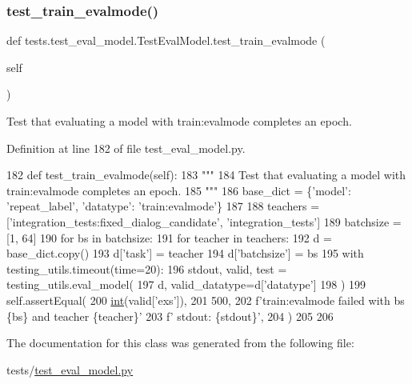 \subsubsection{\texorpdfstring{test\+\_\+train\+\_\+evalmode()}{test\_train\_evalmode()}}
{\footnotesize\ttfamily def tests.\+test\+\_\+eval\+\_\+model.\+Test\+Eval\+Model.\+test\+\_\+train\+\_\+evalmode (\begin{DoxyParamCaption}\item[{}]{self }\end{DoxyParamCaption})}

\begin{DoxyVerb}Test that evaluating a model with train:evalmode completes an epoch.
\end{DoxyVerb}
 

Definition at line 182 of file test\+\_\+eval\+\_\+model.\+py.


\begin{DoxyCode}
182     \textcolor{keyword}{def }test\_train\_evalmode(self):
183         \textcolor{stringliteral}{"""}
184 \textcolor{stringliteral}{        Test that evaluating a model with train:evalmode completes an epoch.}
185 \textcolor{stringliteral}{        """}
186         base\_dict = \{\textcolor{stringliteral}{'model'}: \textcolor{stringliteral}{'repeat\_label'}, \textcolor{stringliteral}{'datatype'}: \textcolor{stringliteral}{'train:evalmode'}\}
187 
188         teachers = [\textcolor{stringliteral}{'integration\_tests:fixed\_dialog\_candidate'}, \textcolor{stringliteral}{'integration\_tests'}]
189         batchsize = [1, 64]
190         \textcolor{keywordflow}{for} bs \textcolor{keywordflow}{in} batchsize:
191             \textcolor{keywordflow}{for} teacher \textcolor{keywordflow}{in} teachers:
192                 d = base\_dict.copy()
193                 d[\textcolor{stringliteral}{'task'}] = teacher
194                 d[\textcolor{stringliteral}{'batchsize'}] = bs
195                 with testing\_utils.timeout(time=20):
196                     stdout, valid, test = testing\_utils.eval\_model(
197                         d, valid\_datatype=d[\textcolor{stringliteral}{'datatype'}]
198                     )
199                 self.assertEqual(
200                     \hyperlink{namespacelanguage__model_1_1eval__ppl_a7d12ee00479673c5c8d1f6d01faa272a}{int}(valid[\textcolor{stringliteral}{'exs'}]),
201                     500,
202                     f\textcolor{stringliteral}{'train:evalmode failed with bs \{bs\} and teacher \{teacher\}'}
203                     f\textcolor{stringliteral}{' stdout: \{stdout\}'},
204                 )
205 
206 
\end{DoxyCode}


The documentation for this class was generated from the following file\+:\begin{DoxyCompactItemize}
\item 
tests/\hyperlink{test__eval__model_8py}{test\+\_\+eval\+\_\+model.\+py}\end{DoxyCompactItemize}

